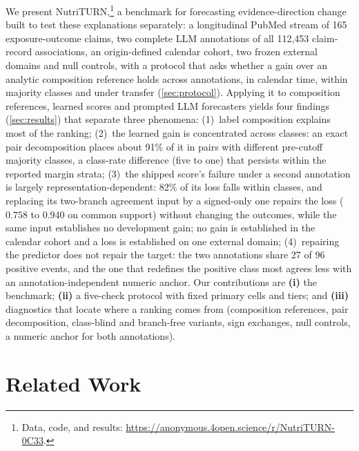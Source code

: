 \documentclass[11pt]{article}
\newcommand{\method}{NutriTURN\xspace}
\begin{document}
We present \method,\footnote{Data, code, and results:
\url{https://anonymous.4open.science/r/NutriTURN-0C33}.} a benchmark for forecasting
evidence-direction change built to test these explanations separately: a
longitudinal PubMed stream of 165 exposure-outcome claims, two complete LLM annotations of all
112{,}453 claim-record associations, an origin-defined calendar cohort, two frozen external domains and null controls, with a protocol that asks whether a gain over an analytic composition reference holds across annotations, in calendar time, within majority classes and under transfer (\cref{sec:protocol}).
Applying it to composition references, learned scores and prompted LLM forecasters yields four findings (\cref{sec:results}) that separate three phenomena: (1)~label composition
explains most of the ranking; (2)~the learned gain is concentrated across classes: an exact pair
decomposition places about 91\% of it in pairs with different pre-cutoff majority classes, a
class-rate difference (five to one) that persists within the reported margin strata; (3)~the shipped score's
failure under a second annotation is largely representation-dependent: 82\% of its loss falls
within classes, and replacing its two-branch agreement input by a signed-only one repairs the loss
($0.758$ to $0.940$ on common support) without changing the outcomes, while the same input
establishes no development gain; no gain is established in the calendar cohort and a loss is
established on one external domain; (4)~repairing the predictor does not repair the target:
the two annotations share 27 of 96 positive events, and the one that redefines the positive class
most agrees less with an annotation-independent numeric anchor. Our contributions are \textbf{(i)} the benchmark; \textbf{(ii)} a five-check
protocol with fixed primary cells and tiers; and \textbf{(iii)} diagnostics that locate where a
ranking comes from (composition references, pair decomposition, class-blind and branch-free
variants, sign exchanges, null controls, a numeric anchor for both annotations).

\section{Related Work}
\end{document}
